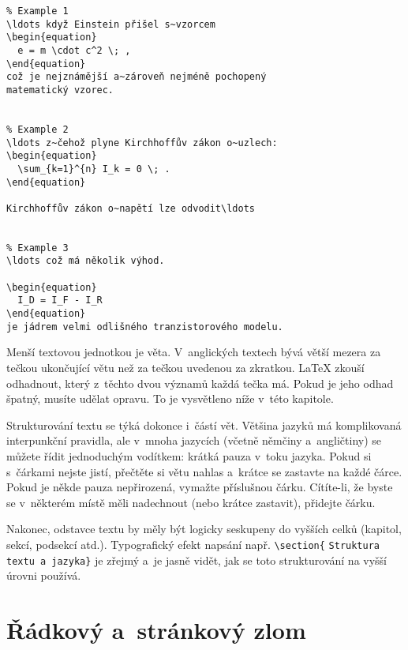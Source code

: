 \begin{code}
\begin{verbatim}
% Example 1
\ldots když Einstein přišel s~vzorcem
\begin{equation} 
  e = m \cdot c^2 \; , 
\end{equation} 
což je nejznámější a~zároveň nejméně pochopený
matematický vzorec.


% Example 2
\ldots z~čehož plyne Kirchhoffův zákon o~uzlech:
\begin{equation} 
  \sum_{k=1}^{n} I_k = 0 \; .
\end{equation} 

Kirchhoffův zákon o~napětí lze odvodit\ldots


% Example 3
\ldots což má několik výhod.

\begin{equation} 
  I_D = I_F - I_R
\end{equation} 
je jádrem velmi odlišného tranzistorového modelu.
\end{verbatim}
\end{code} 

Menší textovou jednotkou je věta.  V~anglických textech bývá větší
mezera za tečkou ukončující větu než za tečkou uvedenou za zkratkou.
\LaTeX{} zkouší odhadnout, který z~těchto dvou významů každá tečka má.
Pokud je jeho odhad špatný, musíte udělat opravu.  To je vysvětleno
níže v~této kapitole.

Strukturování textu se týká dokonce i~částí vět. Většina jazyků
má komplikovaná interpunkční pravidla, ale v~mnoha jazycích
(včetně němčiny a~angličtiny) se můžete řídit jednoduchým vodítkem:
krátká pauza v~toku jazyka. Pokud si s~čárkami nejste jistí,
přečtěte si větu nahlas a~krátce se zastavte na každé čárce.
Pokud je někde pauza nepřirozená, vymažte příslušnou čárku.
Cítíte-li, že byste se v~některém místě měli nadechnout (nebo
krátce zastavit), přidejte čárku.

Nakonec, odstavce textu by měly být logicky seskupeny do vyšších
celků (kapitol, sekcí, podsekcí atd.). Typografický efekt napsání např.
\verb|\section{| \texttt{Struktura textu a~jazyka}\verb|}|
je zřejmý a~je jasně vidět, jak se toto strukturování na vyšší
úrovni používá.

\section{Řádkový a~stránkový zlom}
 
